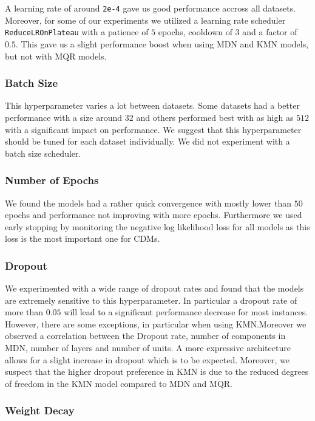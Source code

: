 A learning rate of around \texttt{2e-4} gave us good performance accross all datasets. Moreover, for some of our experiments we utilized a learning rate scheduler \texttt{ReduceLROnPlateau} with a patience of $5$ epochs, cooldown of $3$ and a factor of $0.5$. This gave us a slight performance boost when using MDN and KMN models, but not with MQR models.

\subsubsection{Batch Size}

This hyperparameter varies a lot between datasets. Some datasets had a better performance with a size around $32$ and others performed best with as high as $512$ with a significant impact on performance. We suggest that this hyperparameter should be tuned for each dataset individually. We did not experiment with a batch size scheduler.

\subsubsection{Number of Epochs}

We found the models had a rather quick convergence with mostly lower than $50$ epochs and performance not improving with more epochs. Furthermore we used early stopping by monitoring the negative log likelihood loss for all models as this loss is the most important one for CDMs.

\subsubsection{Dropout}

We experimented with a wide range of dropout rates and found that the models are extremely sensitive to this hyperparameter. In particular a dropout rate of more than $0.05$ will lead to a significant performance decrease for most instances. However, there are some exceptions, in particular when using KMN.\@ Moreover we observed a correlation between the Dropout rate, number of components in MDN, number of layers and number of units. A more expressive architecture allows for a slight increase in dropout which is to be expected. Moreover, we suspect that the higher dropout preference in KMN is due to the reduced degrees of freedom in the KMN model compared to MDN and MQR.\@

\subsubsection{Weight Decay}

